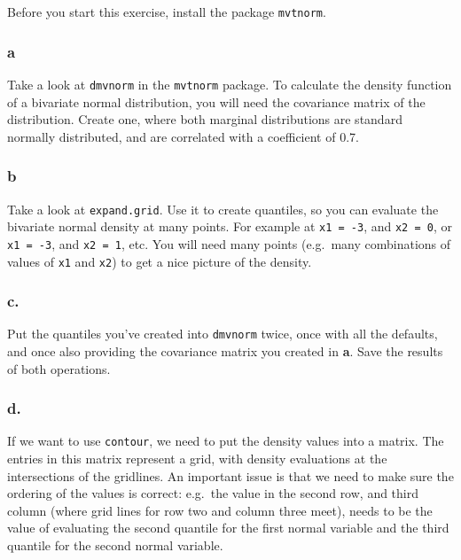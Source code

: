 \documentclass[]{article}
\begin{document}
Before you start this exercise, install the package \texttt{mvtnorm}.

\hypertarget{a-8}{%
\subsubsection{a}\label{a-8}}

Take a look at \texttt{dmvnorm} in the \texttt{mvtnorm} package. To
calculate the density function of a bivariate normal distribution, you
will need the covariance matrix of the distribution. Create one, where
both marginal distributions are standard normally distributed, and are
correlated with a coefficient of 0.7.

\hypertarget{b-8}{%
\subsubsection{b}\label{b-8}}

Take a look at \texttt{expand.grid}. Use it to create quantiles, so you
can evaluate the bivariate normal density at many points. For example at
\texttt{x1\ =\ -3}, and \texttt{x2\ =\ 0}, or \texttt{x1\ =\ -3}, and
\texttt{x2\ =\ 1}, etc. You will need many points (e.g.~many
combinations of values of \texttt{x1} and \texttt{x2}) to get a nice
picture of the density.

\hypertarget{c.}{%
\subsubsection{c.}\label{c.}}

Put the quantiles you've created into \texttt{dmvnorm} twice, once with
all the defaults, and once also providing the covariance matrix you
created in \textbf{a}. Save the results of both operations.

\hypertarget{d.}{%
\subsubsection{d.}\label{d.}}

If we want to use \texttt{contour}, we need to put the density values
into a matrix. The entries in this matrix represent a grid, with density
evaluations at the intersections of the gridlines. An important issue is
that we need to make sure the ordering of the values is correct:
e.g.~the value in the second row, and third column (where grid lines for
row two and column three meet), needs to be the value of evaluating the
second quantile for the first normal variable and the third quantile for
the second normal variable.
\end{document}
